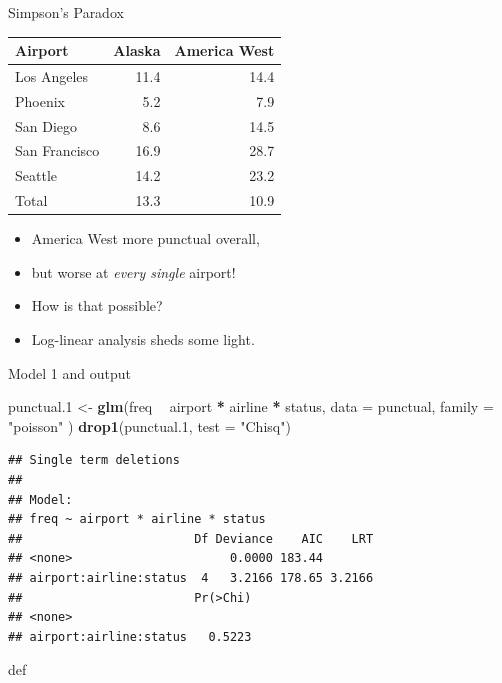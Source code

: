 \documentclass[ignorenonframetext,]{beamer}
\newenvironment{Shaded}{\begin{snugshade}}{\end{snugshade}}
\newcommand{\DataTypeTok}[1]{\textcolor[rgb]{0.13,0.29,0.53}{#1}}
\newcommand{\FloatTok}[1]{\textcolor[rgb]{0.00,0.00,0.81}{#1}}
\newcommand{\KeywordTok}[1]{\textcolor[rgb]{0.13,0.29,0.53}{\textbf{#1}}}
\newcommand{\NormalTok}[1]{#1}
\newcommand{\OperatorTok}[1]{\textcolor[rgb]{0.81,0.36,0.00}{\textbf{#1}}}
\newcommand{\StringTok}[1]{\textcolor[rgb]{0.31,0.60,0.02}{#1}}
\begin{document}
\begin{frame}{Simpson's Paradox}
\protect\hypertarget{simpsons-paradox}{}

\begin{tabular}{|l|rr|}
\hline
Airport & Alaska & America West\\
\hline
Los Angeles & 11.4 & 14.4\\
Phoenix & 5.2 & 7.9\\
San Diego & 8.6 & 14.5\\
San Francisco & 16.9 & 28.7\\
Seattle & 14.2 & 23.2 \\
\hline
Total & 13.3 & 10.9 \\
\hline
\end{tabular}

\begin{itemize}
\item
  America West more punctual overall,
\item
  but worse at \emph{every single} airport!
\item
  How is that possible?
\item
  Log-linear analysis sheds some light.
\end{itemize}

\end{frame}

\begin{frame}[fragile]{Model 1 and output}
\protect\hypertarget{model-1-and-output}{}

\begin{Shaded}
\begin{Highlighting}[]
\NormalTok{punctual}\FloatTok{.1}\NormalTok{ <-}\StringTok{ }\KeywordTok{glm}\NormalTok{(freq }\OperatorTok{~}\StringTok{ }\NormalTok{airport }\OperatorTok{*}\StringTok{ }\NormalTok{airline }\OperatorTok{*}\StringTok{ }\NormalTok{status,}
  \DataTypeTok{data =}\NormalTok{ punctual, }\DataTypeTok{family =} \StringTok{"poisson"}
\NormalTok{)}
\KeywordTok{drop1}\NormalTok{(punctual}\FloatTok{.1}\NormalTok{, }\DataTypeTok{test =} \StringTok{"Chisq"}\NormalTok{)}
\end{Highlighting}
\end{Shaded}

\begin{verbatim}
## Single term deletions
## 
## Model:
## freq ~ airport * airline * status
##                        Df Deviance    AIC    LRT
## <none>                      0.0000 183.44       
## airport:airline:status  4   3.2166 178.65 3.2166
##                        Pr(>Chi)
## <none>                         
## airport:airline:status   0.5223
\end{verbatim}

def

\end{frame}
\end{document}
